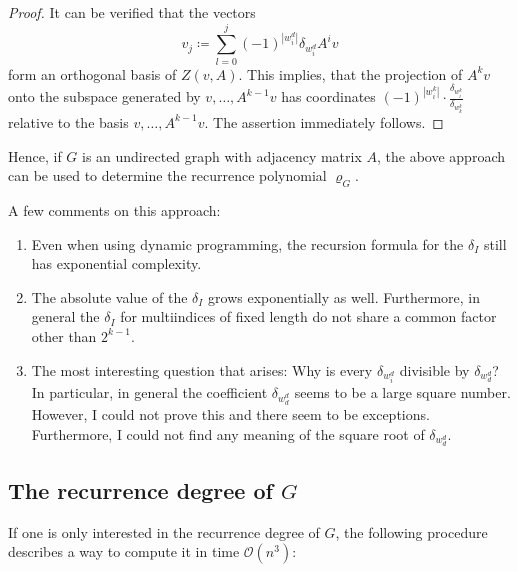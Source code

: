 \documentclass[a4paper,12pt]{article}
\begin{document}
\begin{proof}
It can be verified that the vectors
$$
v_j \coloneqq \sum_{l=0}^j (-1)^{|w^d_i|}\delta_{w^d_i}A^iv
$$
form an orthogonal basis of $Z(v,A)$. This implies, that the projection of $A^kv$ onto the subspace generated by $v, \ldots, A^{k-1}v$ has coordinates $(-1)^{|w^k_i|}\cdot \frac {\delta_{w^k_i}} {\delta_{w^k_k}}$ relative to the basis $v, \ldots, A^{k-1} v$. The assertion immediately follows.
\end{proof}

Hence, if $G$ is an undirected graph with adjacency matrix $A$, the above approach can be used to determine the recurrence polynomial $\varrho_G$.

\begin{remark}
A few comments on this approach:
\begin{enumerate}
\item Even when using dynamic programming, the recursion formula for the $\delta_I$ still has exponential complexity. 
\item The absolute value of the $\delta_I$ grows exponentially as well. Furthermore, in general the $\delta_I$ for multiindices of fixed length do not share a common factor other than $2^{k-1}$.
\item The most interesting question that arises: Why is every $\delta_{w_i^d}$ divisible by $\delta_{w_d^d}$? In particular, in general the coefficient $\delta_{w_d^d}$ seems to be a large square number. However, I could not prove this and there seem to be exceptions. Furthermore, I could not find any meaning of the square root of $\delta_{w_d^d}$.
\end{enumerate}
\end{remark}

\subsection{The recurrence degree of $G$}

If one is only interested in the recurrence degree of $G$, the following procedure describes a way to compute it in time $\mathcal{O}\left(n^3\right)$:
\end{document}
